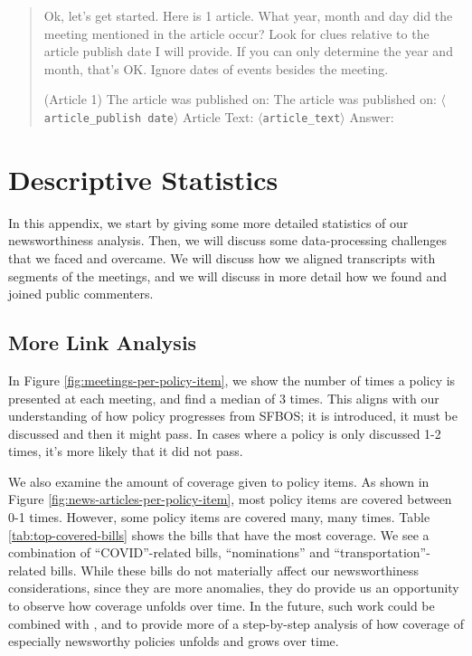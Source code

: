\documentclass[11pt]{article}
\begin{document}
\begin{quote}
        Ok, let's get started. Here is 1 article. What year, month and day did the meeting mentioned in the article occur? 
        Look for clues relative to the article publish date I will provide. If you can only determine the year and month, that's OK. Ignore dates of events besides the meeting.

        (Article 1)
        The article was published on: The article was published on: \texttt{$\langle$article\_publish date$\rangle$}
        Article Text: \texttt{$\langle$article\_text$\rangle$}
        Answer:
\end{quote}

\section{Descriptive Statistics}
\label{app:descriptive-statistics}

In this appendix, we start by giving some more detailed statistics of our newsworthiness analysis. Then, we will discuss some data-processing challenges that we faced and overcame. We will discuss how we aligned transcripts with segments of the meetings, and we will discuss in more detail how we found and joined public commenters.

\subsection{More Link Analysis}

In Figure \ref{fig:meetings-per-policy-item}, we show the number of times a policy is presented at each meeting, and find a median of 3 times. This aligns with our understanding of how policy progresses from SFBOS; it is introduced, it must be discussed and then it might pass. In cases where a policy is only discussed 1-2 times, it's more likely that it did not pass.

We also examine the amount of coverage given to policy items. As shown in Figure \ref{fig:news-articles-per-policy-item}, most policy items are covered between 0-1 times. However, some policy items are covered many, many times. Table \ref{tab:top-covered-bills} shows the bills that have the most coverage. We see a combination of ``COVID''-related bills, ``nominations'' and ``transportation''-related bills. While these bills do not materially affect our newsworthiness considerations, since they are more anomalies, they do provide us an opportunity to observe how coverage unfolds over time. In the future, such work could be combined with \cite{spangher2022newsedits}, \cite{spangher2023identifying} and \cite{spangher2023sequentially} to provide more of a step-by-step analysis of how coverage of especially newsworthy policies unfolds and grows over time.
\end{document}
